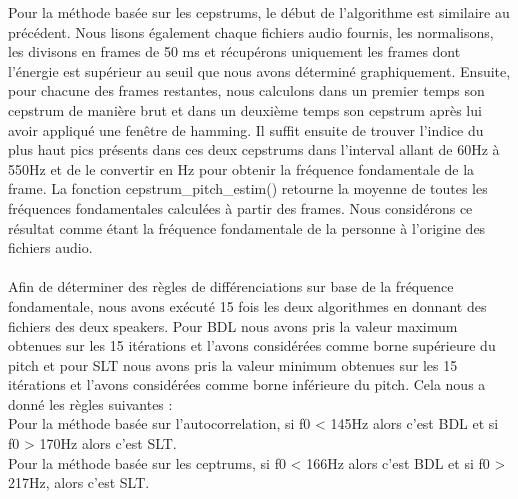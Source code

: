 \documentclass[a4paper,12pt]{report}	%
\begin{document}
Pour la méthode basée sur les cepstrums, le début de l'algorithme est similaire au précédent. Nous lisons également chaque fichiers audio fournis, les normalisons, les divisons en frames de 50 ms et récupérons uniquement les frames dont l'énergie est supérieur au seuil que nous avons déterminé graphiquement. Ensuite, pour chacune des frames restantes, nous calculons dans un premier temps son cepstrum de manière brut et dans un deuxième temps son cepstrum après lui avoir appliqué une fenêtre de hamming. Il suffit ensuite de trouver l'indice du plus haut pics présents dans ces deux cepstrums dans l'interval allant de 60Hz à 550Hz et de le convertir en Hz pour obtenir la fréquence fondamentale de la frame. La fonction cepstrum\_pitch\_estim() retourne la moyenne de toutes les fréquences fondamentales calculées à partir des frames. Nous considérons ce résultat comme étant la fréquence fondamentale de la personne à l'origine des fichiers audio.\\
\\
Afin de déterminer des règles de différenciations sur base de la fréquence fondamentale, nous avons exécuté 15 fois les deux algorithmes en donnant des fichiers des deux speakers. Pour BDL nous avons pris la valeur maximum obtenues sur les 15 itérations et l'avons considérées comme borne supérieure du pitch et pour SLT nous avons pris la valeur minimum obtenues sur les 15 itérations et l'avons considérées comme borne inférieure du pitch. Cela nous a donné les règles suivantes : \\
Pour la méthode basée sur l'autocorrelation, si f0 < 145Hz alors c'est BDL et si f0 > 170Hz alors c'est SLT. \\
Pour la méthode basée sur les ceptrums, si f0 < 166Hz alors c'est BDL et si f0 > 217Hz, alors c'est SLT. 
\end{document}

